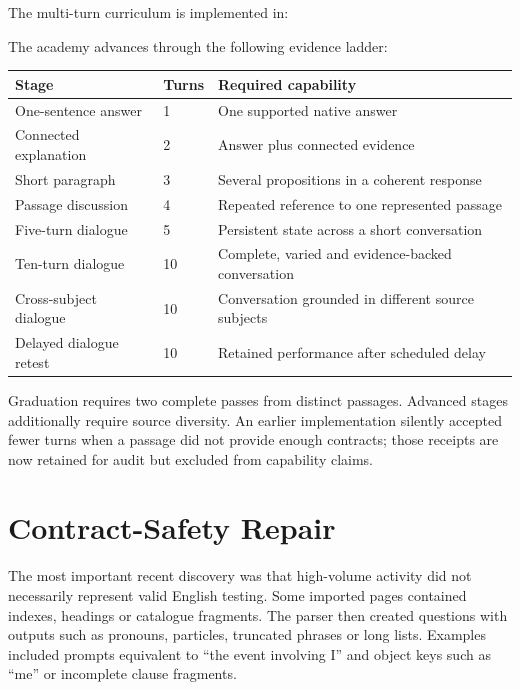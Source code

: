 \documentclass[11pt,a4paper]{article}
\begin{document}
The multi-turn curriculum is implemented in:

\begin{center}
\end{center}

The academy advances through the following evidence ladder:

\begin{longtable}{p{}p{}p{}}
\toprule
Stage & Turns & Required capability \\
\midrule
One-sentence answer & 1 & One supported native answer \\
Connected explanation & 2 & Answer plus connected evidence \\
Short paragraph & 3 & Several propositions in a coherent response \\
Passage discussion & 4 & Repeated reference to one represented passage \\
Five-turn dialogue & 5 & Persistent state across a short conversation \\
Ten-turn dialogue & 10 & Complete, varied and evidence-backed conversation \\
Cross-subject dialogue & 10 & Conversation grounded in different source subjects \\
Delayed dialogue retest & 10 & Retained performance after scheduled delay \\
\bottomrule
\end{longtable}

Graduation requires two complete passes from distinct passages.  Advanced stages additionally
require source diversity.  An earlier implementation silently accepted fewer turns when a
passage did not provide enough contracts; those receipts are now retained for audit but excluded
from capability claims.

\section{Contract-Safety Repair}

The most important recent discovery was that high-volume activity did not necessarily represent
valid English testing.  Some imported pages contained indexes, headings or catalogue fragments.
The parser then created questions with outputs such as pronouns, particles, truncated phrases or
long lists.  Examples included prompts equivalent to ``the event involving I'' and object keys
such as ``me'' or incomplete clause fragments.
\end{document}
